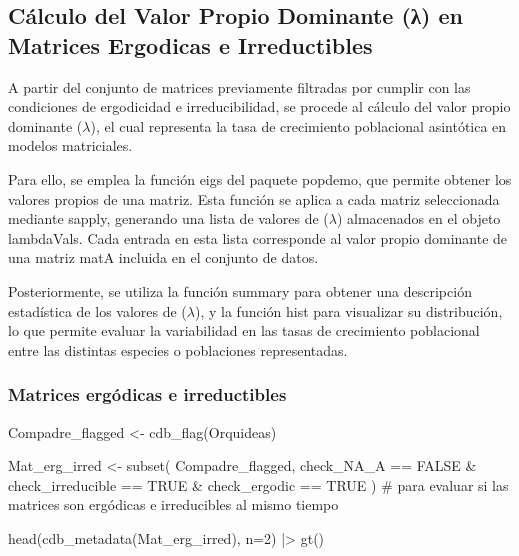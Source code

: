 \documentclass[
  12pt,
  letterpaper,
]{book}
\newenvironment{Shaded}{\begin{snugshade}}{\end{snugshade}}
\newcommand{\AttributeTok}[1]{\textcolor[rgb]{0.40,0.45,0.13}{#1}}
\newcommand{\CommentTok}[1]{\textcolor[rgb]{0.37,0.37,0.37}{#1}}
\newcommand{\ConstantTok}[1]{\textcolor[rgb]{0.56,0.35,0.01}{#1}}
\newcommand{\DecValTok}[1]{\textcolor[rgb]{0.68,0.00,0.00}{#1}}
\newcommand{\FunctionTok}[1]{\textcolor[rgb]{0.28,0.35,0.67}{#1}}
\newcommand{\NormalTok}[1]{\textcolor[rgb]{0.00,0.23,0.31}{#1}}
\newcommand{\OtherTok}[1]{\textcolor[rgb]{0.00,0.23,0.31}{#1}}
\newcommand{\SpecialCharTok}[1]{\textcolor[rgb]{0.37,0.37,0.37}{#1}}
\begin{document}
\subsection{Cálculo del Valor Propio Dominante (λ) en Matrices Ergodicas
e
Irreductibles}\label{cuxe1lculo-del-valor-propio-dominante-ux3bb-en-matrices-ergodicas-e-irreductibles}

A partir del conjunto de matrices previamente filtradas por cumplir con
las condiciones de ergodicidad e irreducibilidad, se procede al cálculo
del valor propio dominante (\(\lambda\)), el cual representa la tasa de
crecimiento poblacional asintótica en modelos matriciales.

Para ello, se emplea la función eigs del paquete popdemo, que permite
obtener los valores propios de una matriz. Esta función se aplica a cada
matriz seleccionada mediante sapply, generando una lista de valores de
(\(\lambda\)) almacenados en el objeto lambdaVals. Cada entrada en esta
lista corresponde al valor propio dominante de una matriz matA incluida
en el conjunto de datos.

Posteriormente, se utiliza la función summary para obtener una
descripción estadística de los valores de (\(\lambda\)), y la función
hist para visualizar su distribución, lo que permite evaluar la
variabilidad en las tasas de crecimiento poblacional entre las distintas
especies o poblaciones representadas.

\subsubsection{Matrices ergódicas e
irreductibles}\label{matrices-erguxf3dicas-e-irreductibles}

\begin{Shaded}
\begin{Highlighting}[]
\NormalTok{Compadre\_flagged }\OtherTok{\textless{}{-}} \FunctionTok{cdb\_flag}\NormalTok{(Orquideas)}


\NormalTok{Mat\_erg\_irred }\OtherTok{\textless{}{-}} \FunctionTok{subset}\NormalTok{(}
\NormalTok{  Compadre\_flagged,}
\NormalTok{  check\_NA\_A }\SpecialCharTok{==} \ConstantTok{FALSE} \SpecialCharTok{\&}\NormalTok{ check\_irreducible }\SpecialCharTok{==} \ConstantTok{TRUE} \SpecialCharTok{\&}\NormalTok{ check\_ergodic }\SpecialCharTok{==} \ConstantTok{TRUE}
\NormalTok{) }\CommentTok{\# para evaluar si las matrices son ergódicas e irreducibles al mismo tiempo}

\FunctionTok{head}\NormalTok{(}\FunctionTok{cdb\_metadata}\NormalTok{(Mat\_erg\_irred), }\AttributeTok{n=}\DecValTok{2}\NormalTok{) }\SpecialCharTok{|\textgreater{}} 
  \FunctionTok{gt}\NormalTok{()}
\end{Highlighting}
\end{Shaded}
\end{document}
